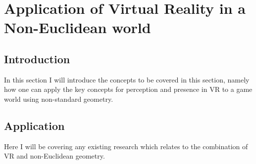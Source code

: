 \section{Application of Virtual Reality in a Non-Euclidean world}
\label{lr:cross}

	\subsection{Introduction}
	\label{lr:cross:intro}
		In this section I will introduce the concepts to be covered in this section, namely how one can apply the key concepts for perception and presence in VR to a game world using non-standard geometry.
	
	\subsection{Application}
	\label{lr:cross:application}
		Here I will be covering any existing research which relates to the combination of VR and non-Euclidean geometry.
	
